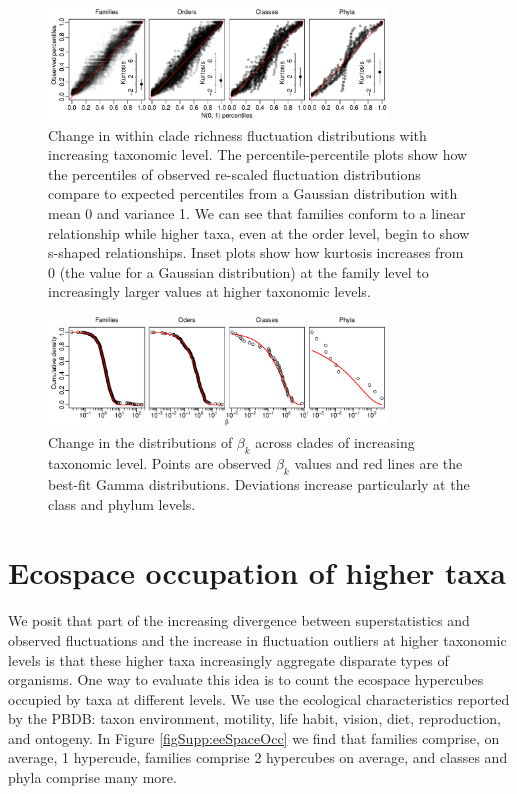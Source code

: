\documentclass[12pt]{article}
\let\citep=\cite
\begin{document}
\begin{figure}[!hp]
  \centering
  \includegraphics[width=0.8\textwidth]{../../figSupp_pkx_allTaxa.pdf}
  \caption{Change in within clade richness fluctuation distributions
    with increasing taxonomic level. The percentile-percentile plots
    show how the percentiles of observed re-scaled fluctuation
    distributions compare to expected percentiles from a Gaussian
    distribution with mean 0 and variance 1. We can see that families
    conform to a linear relationship while higher taxa, even at the
    order level, begin to show s-shaped relationships. Inset plots
    show how kurtosis increases from 0 (the value for a Gaussian
    distribution) at the family level to increasingly larger values
    at higher taxonomic levels.}
  \label{figSupp:pkx_allTaxa}
\end{figure}

\begin{figure}[!hp]
  \centering
  \includegraphics[width=0.8\textwidth]{../../figSupp_fbeta_allTaxa.pdf}
  \caption{Change in the distributions of $\beta_k$ across clades of
    increasing taxonomic level. Points are observed $\beta_k$ values
    and red lines are the best-fit Gamma distributions. Deviations
    increase particularly at the class and phylum levels.}
  \label{figSupp:fbeta_allTaxa}
\end{figure}


\section{Ecospace occupation of higher taxa}
\label{sec:suppGuilds} 

We posit that part of the increasing divergence between
superstatistics and observed fluctuations and the increase in
fluctuation outliers at higher taxonomic levels is that these higher
taxa increasingly aggregate disparate types of organisms. One way to
evaluate this idea is to count the ecospace hypercubes
\citep{bambach1983, bambach2007, bush2007} occupied by taxa at
different levels. We use the ecological characteristics reported by
the PBDB: taxon environment, motility, life habit, vision, diet,
reproduction, and ontogeny. In Figure \ref{figSupp:eeSpaceOcc} we find
that families comprise, on average, 1 hypercude, families comprise 2
hypercubes on average, and classes and phyla comprise many more.
\end{document}
